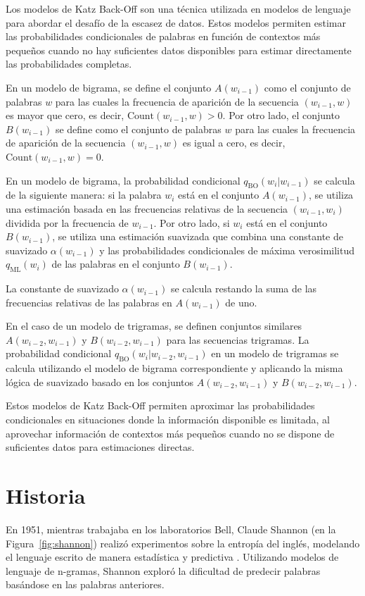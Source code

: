 Los modelos de Katz Back-Off son una técnica utilizada en modelos de lenguaje para abordar el desafío de la escasez de datos. Estos modelos permiten estimar las probabilidades condicionales de palabras en función de contextos más pequeños cuando no hay suficientes datos disponibles para estimar directamente las probabilidades completas.

En un modelo de bigrama, se define el conjunto $A(w_{i-1})$ como el conjunto de palabras $w$ para las cuales la frecuencia de aparición de la secuencia $(w_{i-1}, w)$ es mayor que cero, es decir, $\text{Count}(w_{i-1}, w) > 0$. Por otro lado, el conjunto $B(w_{i-1})$ se define como el conjunto de palabras $w$ para las cuales la frecuencia de aparición de la secuencia $(w_{i-1}, w)$ es igual a cero, es decir, $\text{Count}(w_{i-1}, w) = 0$.

En un modelo de bigrama, la probabilidad condicional $q_{\text{BO}}(w_i | w_{i-1})$ se calcula de la siguiente manera: si la palabra $w_i$ está en el conjunto $A(w_{i-1})$, se utiliza una estimación basada en las frecuencias relativas de la secuencia $(w_{i-1}, w_i)$ dividida por la frecuencia de $w_{i-1}$. Por otro lado, si $w_i$ está en el conjunto $B(w_{i-1})$, se utiliza una estimación suavizada que combina una constante de suavizado $\alpha(w_{i-1})$ y las probabilidades condicionales de máxima verosimilitud $q_{\text{ML}}(w_i)$ de las palabras en el conjunto $B(w_{i-1})$.

La constante de suavizado $\alpha(w_{i-1})$ se calcula restando la suma de las frecuencias relativas de las palabras en $A(w_{i-1})$ de uno.

En el caso de un modelo de trigramas, se definen conjuntos similares $A(w_{i-2}, w_{i-1})$ y $B(w_{i-2}, w_{i-1})$ para las secuencias trigramas. La probabilidad condicional $q_{\text{BO}}(w_i | w_{i-2}, w_{i-1})$ en un modelo de trigramas se calcula utilizando el modelo de bigrama correspondiente y aplicando la misma lógica de suavizado basado en los conjuntos $A(w_{i-2}, w_{i-1})$ y $B(w_{i-2}, w_{i-1})$.

Estos modelos de Katz Back-Off permiten aproximar las probabilidades condicionales en situaciones donde la información disponible es limitada, al aprovechar información de contextos más pequeños cuando no se dispone de suficientes datos para estimaciones directas.

\section{Historia}
En 1951, mientras trabajaba en los laboratorios Bell, Claude Shannon (en la Figura~\ref{fig:shannon}) realizó experimentos sobre la entropía del inglés, modelando el lenguaje escrito de manera estadística y predictiva \cite{shannon1951prediction}. Utilizando modelos de lenguaje de n-gramas, Shannon exploró la dificultad de predecir palabras basándose en las palabras anteriores.

